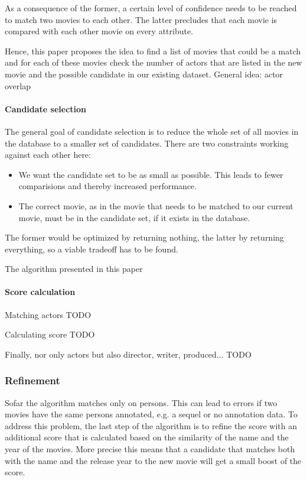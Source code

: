 As a consequence of the former, a certain level of confidence needs to be reached to match two movies to each other. The latter precludes that each movie is compared with each other movie on every attribute.

Hence, this paper proposes the idea to find a list of movies that could be a match and for each of these movies check the number of actors that are listed in the new movie and the possible candidate in our existing dataset.
General idea: actor overlap

\paragraph{Candidate selection}

The general goal of candidate selection is to reduce the whole set of all movies in the database to a smaller set of candidates.
There are two constraints working against each other here:
\begin{itemize}
	\item We want the candidate set to be as small as possible. This leads to fewer comparisions and thereby increased performance.
	\item The correct movie, as in the movie that needs to be matched to our current movie, must be in the candidate set, if it exists in the database.
\end{itemize}
The former would be optimized by returning nothing, the latter by returning everything, so a viable tradeoff has to be found.

The algorithm presented in this paper 
\paragraph{Score calculation}
Matching actors TODO

Calculating score TODO

Finally, nor only actors but also director, writer, produced... TODO

\subsubsection{Refinement}
Sofar the algorithm matches only on persons. This can lead to errors if two movies have the same persons annotated, e.g. a sequel or no annotation data. To address this problem, the last step of the algorithm is to refine the score with an additional score that is calculated based on the similarity of the name and the year of the movies. More precise this means that a candidate that matches both with the name and the release year to the new movie will get a small boost of the score.

